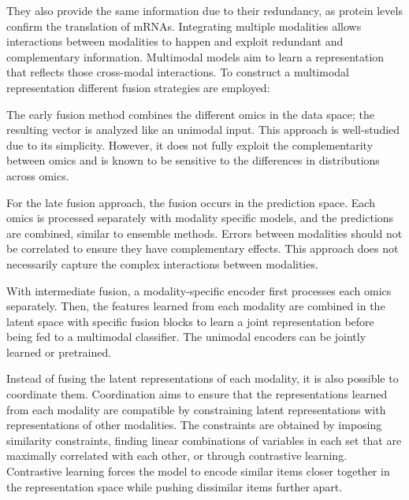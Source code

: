 \documentclass[../main.tex]{subfiles}
\begin{document}
	  They also provide the same information due to their redundancy, as protein levels confirm the translation of mRNAs.
	  Integrating multiple modalities allows interactions between modalities to happen and exploit redundant and complementary information.
	  Multimodal models aim to learn a representation that reflects those cross-modal interactions.
	  To construct a multimodal representation different fusion strategies are employed:
	  \begin{description}[%
	      style=multiline,
	      leftmargin=!,
	      labelwidth=2.5cm,
	    ]
	    \item[Early fusion]
		    The early fusion method combines the different omics in the data space; the resulting vector is analyzed like an unimodal input.
		    This approach is well-studied due to its simplicity.
		    However, it does not fully exploit the complementarity between omics and is known to be sensitive to the differences in distributions across omics.
	    \item[Late fusion]
		    For the late fusion approach, the fusion occurs in the prediction space.
		    Each omics is processed separately with modality specific models, and the predictions are combined, similar to ensemble methods.
		    Errors between modalities should not be correlated to ensure they have complementary effects.
		    This approach does not necessarily capture the complex interactions between modalities.
	    \item[Intermediate fusion]
		    With intermediate fusion, a modality-specific encoder first processes each omics separately.
		    Then, the features learned from each modality are combined in the latent space with specific fusion blocks to learn a joint representation before being fed to a multimodal classifier.
		    The unimodal encoders can be jointly learned or pretrained.
	  \end{description}
	  Instead of fusing the latent representations of each modality, it is also possible to coordinate them.
	  Coordination aims to ensure that the representations learned from each modality are compatible by constraining latent representations with representations of other modalities.
	  The constraints are obtained by imposing similarity constraints, finding linear combinations of variables in each set that are maximally correlated with each other, or through contrastive learning.
	  Contrastive learning forces the model to encode similar items closer together in the representation space while pushing dissimilar items further apart.
\end{document}
